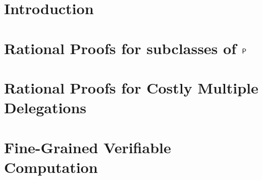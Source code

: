 \documentclass[justified,nobib]{tufte-book}
\begin{document}
	



% 


\pagestyle{fancy}

\chapter{Introduction}


%

\chapter{Rational Proofs for subclasses of $\P$}


\chapter{Rational Proofs for Costly Multiple Delegations}


\chapter{Fine-Grained Verifiable Computation}


%
%



\printbibliography
\end{document}
